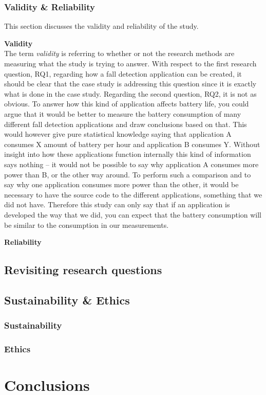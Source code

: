 \documentclass[12pt, a4paper, onecolumn]{article}
\newcommand{\parag}[1]{
	\textbf{#1} \hspace{0pt} \\
}
\begin{document}
	\subsubsection{Validity \& Reliability}
	
	This section discusses the validity and reliability of the study.
	
	\parag{Validity}
	The term \textit{validity} is referring to whether or not the research methods are measuring what the study is trying to answer. With respect to the first research question, RQ1, regarding how a fall detection application can be created, it should be clear that the case study is addressing this question since it is exactly what is done in the case study. Regarding the second question, RQ2, it is not as obvious. To answer how this kind of application affects battery life, you could argue that it would be better to measure the battery consumption of many different fall detection applications and draw conclusions based on that. This would however give pure statistical knowledge saying that application A consumes X amount of battery per hour and application B consumes Y. Without insight into how these applications function internally this kind of information says nothing -- it would not be possible to say why application A consumes more power than B, or the other way around. To perform such a comparison and to say why one application consumes more power than the other, it would be necessary to have the source code to the different applications, something that we did not have. Therefore this study can only say that if an application is developed the way that we did, you can expect that the battery consumption will be similar to the consumption in our measurements.
	
	\parag{Reliability}
	
	
	\subsection{Revisiting research questions}
	
	\subsection{Sustainability \& Ethics}
	
	\subsubsection{Sustainability}
	
	\subsubsection{Ethics}
	
	\section{Conclusions}
	\newpage
	
	
	
	
\end{document}
